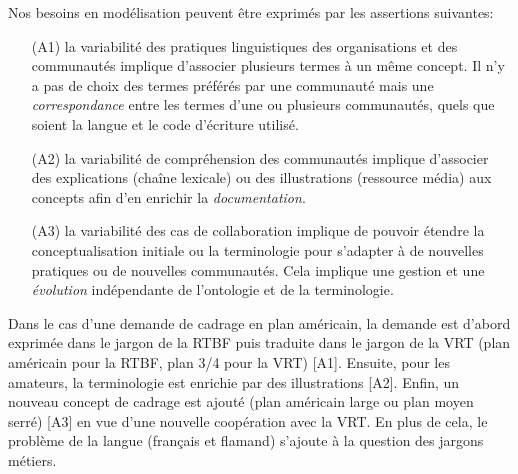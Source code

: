 Nos besoins en modélisation peuvent être exprimés par les assertions suivantes:
\begin{enumerate}
	\item[(A1)] la variabilité des pratiques linguistiques des organisations et des communautés implique d'associer plusieurs termes à un même concept. 
	Il n'y a pas de choix des termes préférés par une communauté mais une \textit{correspondance} entre les termes d'une ou plusieurs communautés, quels que soient la langue et le code d'écriture utilisé.
	
	\item[(A2)] la variabilité de compréhension des communautés implique d'associer des explications (chaîne lexicale) ou des illustrations (ressource média) aux concepts afin d'en enrichir la \textit{documentation}. 
	
	\item[(A3)] la variabilité des cas de collaboration implique de pouvoir étendre la conceptualisation initiale ou la terminologie pour s'adapter à de nouvelles pratiques ou de nouvelles communautés. 
	Cela implique une gestion et une \textit{évolution} indépendante de l'ontologie et de la terminologie. 
\end{enumerate}


Dans le cas d'une demande de cadrage en plan américain, la demande est d'abord exprimée dans le jargon de la RTBF puis traduite dans le jargon de la VRT (plan américain pour la RTBF, plan 3/4 pour la VRT) [A1]. 
Ensuite, pour les amateurs, la terminologie est enrichie par des illustrations [A2]. Enfin, un nouveau concept de cadrage est ajouté (plan américain large ou plan moyen serré) [A3] en vue d'une nouvelle coopération avec la VRT. En plus de cela, le problème de la langue (français et flamand) s'ajoute à la question des jargons métiers. 
